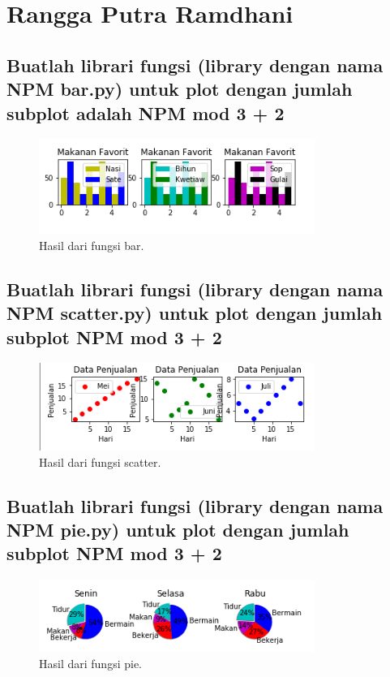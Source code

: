 \section{Rangga Putra Ramdhani}
\subsection{Buatlah librari fungsi (library dengan nama NPM bar.py) untuk plot dengan jumlah subplot adalah NPM mod 3 + 2}

\begin{figure}[H]
	\includegraphics[width=9cm]{figures/6/Praktek/1174056/bar.png}
	\caption{Hasil dari fungsi bar.}
	\centering
\end{figure}

\subsection{Buatlah librari fungsi (library dengan nama NPM scatter.py) untuk plot dengan jumlah subplot NPM mod 3 + 2}

\begin{figure}[H]
	\includegraphics[width=9cm]{figures/6/Praktek/1174056/scatter.png}
	\caption{Hasil dari fungsi scatter.}
	\centering
\end{figure}

\subsection{Buatlah librari fungsi (library dengan nama NPM pie.py) untuk plot dengan jumlah subplot NPM mod 3 + 2}

\begin{figure}[H]
	\includegraphics[width=9cm]{figures/6/Praktek/1174056/pie.png}
	\caption{Hasil dari fungsi pie.}
	\centering
\end{figure}

